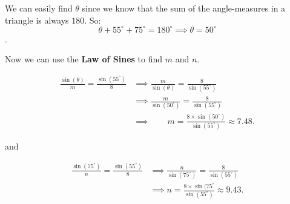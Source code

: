 \begin{solution}
	\label{sol:law_of_sines}

	We can easily find $\theta$ since we know that the sum of the angle-measures
	in a triangle is always $180$. So:
	\[
		\theta + 55^{\circ} + 75^{\circ} = 180^{\circ} \implies \theta = 50^{\circ}
	\].

	Now we can use the \textbf{Law of Sines} to find $m$ and $n$.

	\begin{align*}
		\frac{\sin (\theta)}{m} = \frac{\sin (55^{\circ})}{8} & \implies \frac{m}{\sin (\theta)} = \frac{8}{\sin (55^{\circ})}                        \\
		                                                      & \implies \frac{m}{\sin (50^{\circ})} = \frac{8}{\sin (55^{\circ})}                    \\
		                                                      & \implies \qquad m = \frac{8 \times \sin (50^{\circ})}{\sin (55^{\circ})} \approx 7.48
		.\end{align*}

	and

	\begin{align*}
		\frac{\sin (75^{\circ})}{n} = \frac{\sin (55^{\circ})}{8} & \implies \frac{n}{\sin (75^{\circ})} = \frac{8}{\sin (55^{\circ})}            \\
		                                                          & \implies n = \frac{8 \times \sin (75^{\circ}}{\sin (55^{\circ})} \approx 9.43
		.\end{align*}

	\begin{figure}[H]
		\centering


		\caption{}
		\label{fig:law_of_sines_with_missing_angles_and_side_lengths_2}
	\end{figure}
\end{solution}

